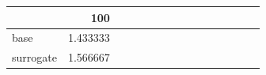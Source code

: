 \begin{tabular}{lrrrrrrrrrrrrrr}
\toprule
{} &       100 \\
\midrule
base      &  1.433333 \\
surrogate &  1.566667 \\
\bottomrule
\end{tabular}

